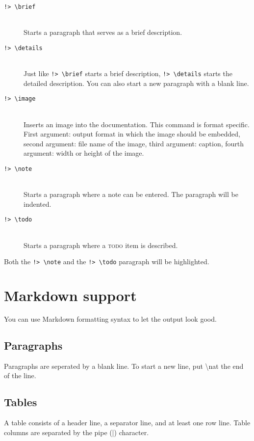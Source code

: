 \documentclass[a4paper,11pt,headsepline]{scrartcl}
\begin{document}

\begin{description}
\item[\texttt{!> \textbackslash brief}]\hfill \\ 
Starts a paragraph that serves as a brief description.
\item[\texttt{!> \textbackslash details}]\hfill \\ 
Just like \texttt{!> \textbackslash brief} starts a brief description, \texttt{!> \textbackslash details} starts the detailed description. You can also start a new paragraph with a blank line.
\item[\texttt{!> \textbackslash image}] \hfill \\ 
Inserts an image into the documentation. This command is format specific. First argument:  output format in which the image should be embedded, second argument: file name of the image, third argument: caption, fourth argument: width or height of the image.
\end{description}

\begin{description}
\item[\texttt{!> \textbackslash note}]\hfill \\ 
Starts a paragraph where a note can be entered. The paragraph will be indented.
\item[\texttt{!> \textbackslash todo}]\hfill \\
 Starts a paragraph where a \textsc{todo} item is described.
\end{description}
Both the \texttt{!> \textbackslash note} and the \texttt{!> \textbackslash todo} paragraph will be highlighted.
\section{Markdown support} \label{markdown}
You can use Markdown formatting syntax to let the output look good.
\subsection{Paragraphs}
Paragraphs are seperated by a blank line. To start a new line, put \grqq \textbackslash n\grqq at the end of the line.
\subsection{Tables} 
A table consists of a header line, a separator line, and at least one row line. Table columns are separated by the pipe (|) character.

\end{document}
